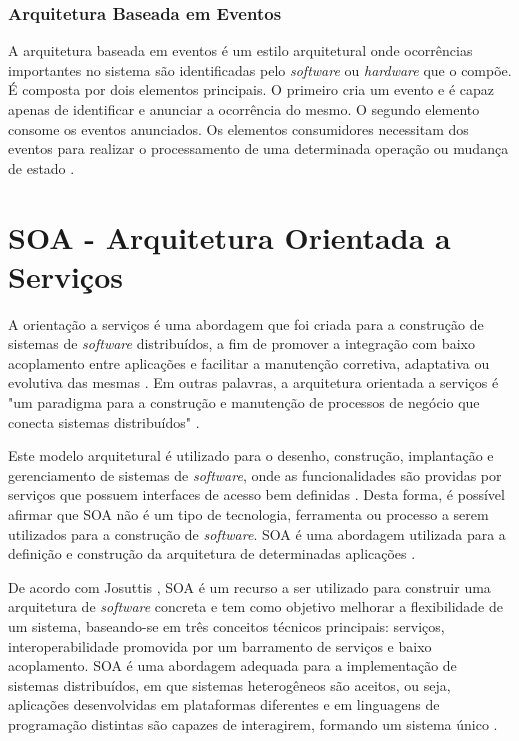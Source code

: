 \subsubsection{Arquitetura Baseada em Eventos}
A arquitetura baseada em eventos é um estilo arquitetural onde ocorrências importantes no sistema são identificadas pelo \textit{software} ou \textit{hardware} que o compõe. É composta por dois elementos principais. O primeiro cria um evento e é capaz apenas de identificar e anunciar a ocorrência do mesmo. O segundo elemento consome os eventos anunciados. Os elementos consumidores necessitam dos eventos para realizar o processamento de uma determinada operação ou mudança de estado \cite{rouse}.

\section{SOA - Arquitetura Orientada a Serviços}
A orientação a serviços é uma abordagem que foi criada para a construção de sistemas de \textit{software} distribuídos, a fim de promover a integração com baixo acoplamento entre aplicações e facilitar a manutenção corretiva, adaptativa ou evolutiva das mesmas \cite{linthicum_soainrealworld_2007}. Em outras palavras, a arquitetura orientada a serviços é "um paradigma para a construção e manutenção de processos de negócio que conecta sistemas distribuídos" \cite{josuttis_soa_2007}.

Este modelo arquitetural é utilizado para o desenho, construção, implantação e gerenciamento de sistemas de \textit{software}, onde as funcionalidades são providas por serviços que possuem interfaces de acesso bem definidas \cite{lewis_getting_2010}. Desta forma, é possível afirmar que SOA não é um tipo de tecnologia, ferramenta ou processo a serem utilizados para a construção de \textit{software}. SOA é uma abordagem utilizada para a definição e construção da arquitetura de determinadas aplicações \cite{oliveira_interoperabilidade}.

De acordo com Josuttis \cite{josuttis_soa_2007}, SOA é um recurso a ser utilizado para construir uma arquitetura de \textit{software} concreta e tem como objetivo melhorar a flexibilidade de um sistema, baseando-se em três conceitos técnicos principais: serviços, interoperabilidade promovida por um barramento de serviços e baixo acoplamento. SOA é uma abordagem adequada para a implementação de sistemas distribuídos, em que sistemas heterogêneos são aceitos, ou seja, aplicações desenvolvidas em plataformas diferentes e em linguagens de programação distintas são capazes de interagirem, formando um sistema único \cite{josuttis_soa_2007}.

